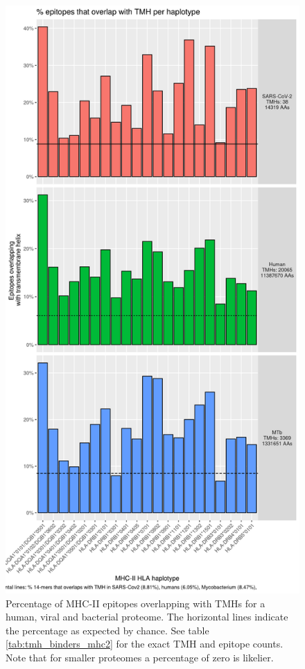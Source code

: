 \begin{figure}[!htbp]
  \includegraphics[height=0.9\textheight]{bbbq_1_smart_results/fig_f_tmh_mhc2_2_grid.png}
  \caption{
    Percentage of MHC-II epitopes overlapping with TMHs
    for a human, viral and bacterial proteome.
    The horizontal lines indicate the percentage as expected by chance.
    See table \ref{tab:tmh_binders_mhc2} for the exact TMH and epitope counts.
    Note that for smaller proteomes a percentage of zero is likelier.
  }
  \label{fig:2}
\end{figure}


